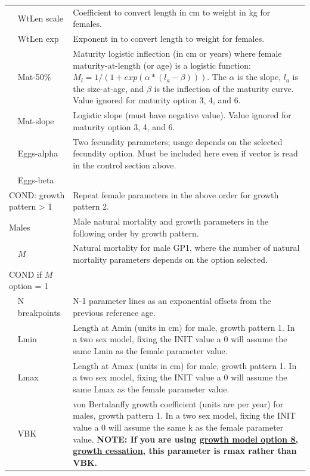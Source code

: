 \begin{longtable}{p{1cm} p{2.25cm} p{10cm}}
	\Tstrut & WtLen scale & Coefficient to convert length in cm to weight in kg for females. \\
	& WtLen exp & Exponent in to convert length to weight for females. \\
	& Mat-50\% & Maturity logistic inflection (in cm or years) where female maturity-at-length (or age) is a logistic function: $M_{l} = 1/(1+exp(\alpha*(l_{a} - \beta)))$. The $\alpha$ is the slope, $l_{a}$ is the size-at-age, and $\beta$ is the inflection of the maturity curve. Value ignored for maturity option 3, 4, and 6. \\ 
	& Mat-slope & Logistic slope (must have negative value). Value ignored for maturity option 3, 4, and 6. \\
	& Eggs-alpha & Two fecundity parameters; usage depends on the selected fecundity option. Must be included here even if vector is read in the control section above. \\
	& Eggs-beta & \Bstrut\\
	\hline

	\multicolumn{2}{l}{COND: growth pattern > 1} \Tstrut & Repeat female parameters in the above order for growth pattern 2. \Bstrut\\
	\hline

	\multicolumn{2}{l}{Males} \Tstrut & Male natural mortality and growth parameters in the following order by growth pattern. \Bstrut\\
	& $M$ & Natural mortality for male GP1, where the number of natural mortality parameters depends on the option selected. \Bstrut\\
	\hline
	\multicolumn{2}{l}{COND if $M$ option = 1} & \Tstrut\\
	& N breakpoints & N-1 parameter lines as an exponential offsets from the previous reference age. \Bstrut\\
	\hline
		
	& Lmin & Length at Amin (units in cm) for male, growth pattern 1. In a two sex model, fixing the INIT value a 0 will assume the same Lmin as the female parameter value. \\
	& Lmax & Length at Amax (units in cm) for male, growth pattern 1. In a two sex model, fixing the INIT value a 0 will assume the same Lmax as the female parameter value. \\
	& VBK & von Bertalanffy growth coefficient (units are per year) for males, growth pattern 1. In a two sex model, fixing the INIT value a 0 will assume the same k as the female parameter value. \textbf{NOTE: If you are using \hyperlink{GrowthCessation}{growth model option 8, growth cessation}, this parameter is rmax rather than VBK.} \Bstrut\\
	\hline


\end{longtable}
